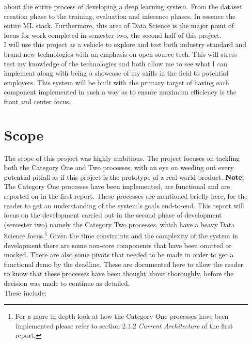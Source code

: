 about the entire process of developing a deep learning system. From the dataset creation phase to the training, evaluation and inference phases.
In essence the entire ML stack. Furthermore, this area of Data Science is the major point of focus for work completed in semester two, the second half of this project.\\
I will use this project as a vehicle to explore and test both industry standard and brand-new technologies with an emphasis on open-source tech.
This will stress test my knowledge of the
technologies and both allow me to see what I can implement along with being a showcase of my skills in the field to potential employers.
This system will be built with the primary target of having each component implemented in such a way as to ensure maximum efficiency is the
front and center focus.
\section{Scope}
The scope of this project was highly ambitious. The project focuses on tackling both the Category One and Two processes, with
an eye on weeding out every potential pitfall as if this project is the prototype of a real world product.
\bigbreak
\textbf{Note:} The Category One processes have been implemented, are functional and are reported on in the first report.
These processes are mentioned briefly here, for the reader to get an understanding of the
system's goals end-to-end. This report will focus on the development carried out in the second phase of development (semester two)
namely the Category Two processes, which have a heavy Data Science focus.\footnote{For a more in depth look at how the Category One
	processes have been implemented please refer to section 2.1.2 \emph{Current Architecture} of the first report.}
\bigbreak
Given the time constraints and the complexity of the system in development
there are some non-core components that	have been omitted or mocked. There are also some
pivots that needed to be made in order to get a functional demo by the deadline. These are
documented here to allow the reader to know that these processes have been thought about thoroughly,
before the decision was made to continue as detailed. \\ These include:
